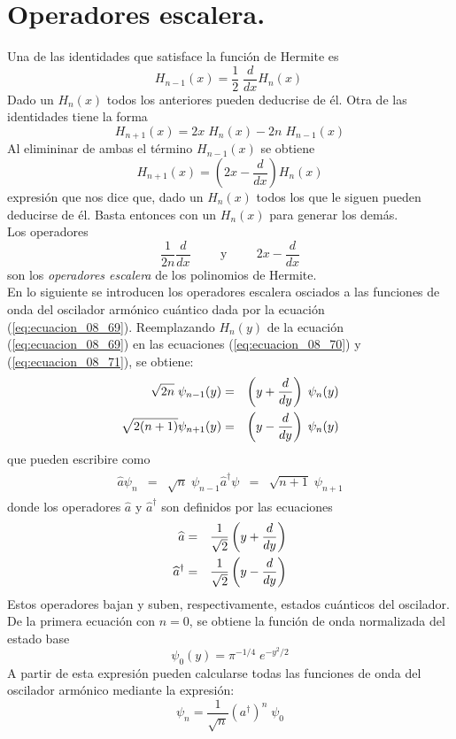 \section{Operadores escalera.}
Una de las identidades que satisface la función de Hermite es
\begin{equation}
H_{n-1}(x) = \dfrac{1}{2} \; \dfrac{d}{d x} H_{n}(x)\
\label{eq:ecuacion_08_70}
\end{equation}
Dado un $H_{n}(x)$ todos los anteriores pueden deducrise de él. Otra de las identidades  tiene la forma
\[ H_{n+1}(x) =  2x \; H_{n}(x) - 2 n \; H_{n-1}(x) \]
Al elimininar de ambas el término $H_{n-1}(x)$ se obtiene
\begin{equation}
H_{n+1}(x) = \left(2 x - \dfrac{d}{dx} \right) H_{n}(x)
\label{eq:ecuacion_08_71}
\end{equation}
expresión que nos dice que, dado un $H_{n}(x)$ todos los que le siguen pueden deducirse de él. Basta entonces con un $H_{n}(x)$ para generar los demás.
\\
Los operadores
\[ \dfrac{1}{2n} \dfrac{d}{dx} \hspace{1cm} \text{y} \hspace{1cm} 2x - \dfrac{d}{dx} \]
son los \emph{operadores escalera} de los polinomios de Hermite.
\\
En lo siguiente se introducen los operadores escalera osciados a las funciones de onda del oscilador armónico cuántico dada por la ecuación (\ref{eq:ecuacion_08_69}). Reemplazando $H_{n}(y)$ de la ecuación (\ref{eq:ecuacion_08_69}) en las ecuaciones (\ref{eq:ecuacion_08_70}) y (\ref{eq:ecuacion_08_71}), se obtiene:
\begin{eqnarray*}
\sqrt{2n} \; \psi_{n - 1}(y) &=& \left( y + \dfrac{d}{dy} \right) \; \psi_{n}(y) \nonumber \\
\sqrt{2(n + 1)} \psi_{n + 1}(y) &=& \left( y - \dfrac{d}{dy} \right) \; \psi_{n}(y) \nonumber
\end{eqnarray*}
que pueden escribire como
\begin{eqnarray}
\begin{aligned}
\widehat{a} \psi_{n} &=& \sqrt{n} \; \psi_{n-1} 
\widehat{a}^{\dagger} \psi &=& \sqrt{n + 1} \; \psi_{n + 1}
\end{aligned}
\label{eq:ecuacion_08_72}
\end{eqnarray}
donde los operadores $\widehat{a}$ y $\widehat{a}^{\dagger}$ son definidos por las ecuaciones
\begin{eqnarray*}
\widehat{a} &=& \dfrac{1}{\sqrt{2}} \left( y + \dfrac{d}{dy} \right) \nonumber \\
\widehat{a}^{\dagger} &=& \dfrac{1}{\sqrt{2}} \left( y - \dfrac{d}{dy} \right) \nonumber
\end{eqnarray*}
Estos operadores bajan y suben, respectivamente, estados cuánticos del oscilador. De la primera ecuación con $n=0$, se obtiene la función de onda normalizada del estado base
\[ \psi_{0}(y) = \pi^{-1/4} \; e^{-y^{2}/2} \]
A partir de esta expresión pueden calcularse todas las funciones de onda del oscilador armónico mediante la expresión:
\begin{equation}
\psi_{n} = \dfrac{1}{\sqrt{n}} \left( a^{\dagger} \right)^{n} \; \psi_{0}
\label{eq:ecuacion_08_73}
\end{equation}

